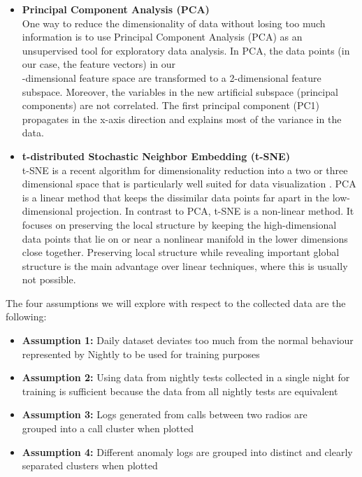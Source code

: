 \begin{itemize} 

\item \textbf{ Principal Component Analysis (PCA)} \\ One way to reduce the dimensionality of data without losing too much information is to use Principal Component Analysis (PCA) as an unsupervised tool for exploratory data analysis. In PCA, the data points (in our case, the feature vectors) in our\\ \featureVectorLength-dimensional feature space are transformed to a 2-dimensional feature subspace. Moreover, the variables in the new artificial subspace (principal components) are not correlated. The first principal component (PC1) propagates in the x-axis direction and explains most of the variance in the data.
    
   \item \textbf{ t-distributed Stochastic Neighbor Embedding (t-SNE)}\\ t-SNE is a recent algorithm for dimensionality reduction into a two or three dimensional space that is particularly well suited for data visualization \cite{tsne}. PCA is a linear method that keeps the dissimilar data points far apart in the low-dimensional projection. In contrast to PCA, t-SNE is a non-linear method. It focuses on preserving the local structure by keeping the high-dimensional data points that lie on or near a nonlinear manifold in the lower dimensions close together. Preserving local structure while revealing important global structure is the main advantage over linear techniques, where this is usually not possible.
    
\end{itemize}

The four assumptions we will explore with respect to the collected data are the following: 

\begin{itemize} 
    \item \textbf{Assumption 1:} Daily dataset deviates too much from the normal behaviour represented by Nightly to be used for training purposes 
    \item \textbf{Assumption 2:} Using data from nightly tests collected in a single night for training is sufficient because the data from all nightly tests are equivalent 
    \item \textbf{Assumption 3:} Logs generated from calls between two radios are\\
    grouped into a call cluster when plotted 
    \item \textbf{Assumption 4:} Different anomaly logs are grouped into distinct and clearly separated clusters when plotted
\end{itemize}


